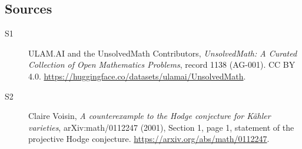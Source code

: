 \documentclass[11pt]{article}
\begin{document}
\subsection{Sources}
\begin{description}
\item[\hypertarget{source:1138:1}{S1}] ULAM.AI and the UnsolvedMath Contributors, \emph{UnsolvedMath: A Curated Collection of Open Mathematics Problems}, record 1138 (AG-001). CC BY 4.0. \url{https://huggingface.co/datasets/ulamai/UnsolvedMath}.
\item[\hypertarget{source:1138:2}{S2}] Claire Voisin, \emph{A counterexample to the Hodge conjecture for K\"ahler varieties}, arXiv:math/0112247 (2001), Section 1, page 1, statement of the projective Hodge conjecture. \url{https://arxiv.org/abs/math/0112247}.
\end{description}
\label{end:1138}
\end{document}
